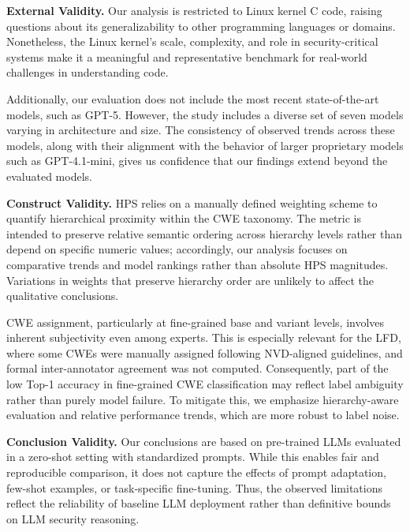 \documentclass[lettersize,journal]{IEEEtran}
\begin{document}
\textbf{External Validity.}
Our analysis is restricted to Linux kernel C code, raising questions about its generalizability to other programming languages or domains. Nonetheless, the Linux kernel’s scale, complexity, and role in security-critical systems make it a meaningful and representative benchmark for real-world challenges in understanding code.

Additionally, our evaluation does not include the most recent state-of-the-art models, such as GPT-5. However, the study includes a diverse set of seven models varying in architecture and size. The consistency of observed trends across these models, along with their alignment with the behavior of larger proprietary models such as GPT-4.1-mini, gives us confidence that our findings extend beyond the evaluated models.


\textbf{Construct Validity.}
HPS relies on a manually defined weighting scheme to quantify hierarchical proximity within the CWE taxonomy. The metric is intended to preserve relative semantic ordering across hierarchy levels rather than depend on specific numeric values; accordingly, our analysis focuses on comparative trends and model rankings rather than absolute HPS magnitudes. Variations in weights that preserve hierarchy order are unlikely to affect the qualitative conclusions.

CWE assignment, particularly at fine-grained base and variant levels, involves inherent subjectivity even among experts. This is especially relevant for the LFD, where some CWEs were manually assigned following NVD-aligned guidelines, and formal inter-annotator agreement was not computed. Consequently, part of the low Top-1 accuracy in fine-grained CWE classification may reflect label ambiguity rather than purely model failure. To mitigate this, we emphasize hierarchy-aware evaluation and relative performance trends, which are more robust to label noise.

\textbf{Conclusion Validity.}
Our conclusions are based on pre-trained LLMs evaluated in a zero-shot setting with standardized prompts. While this enables fair and reproducible comparison, it does not capture the effects of prompt adaptation, few-shot examples, or task-specific fine-tuning. Thus, the observed limitations reflect the reliability of baseline LLM deployment rather than definitive bounds on LLM security reasoning.
\end{document}
